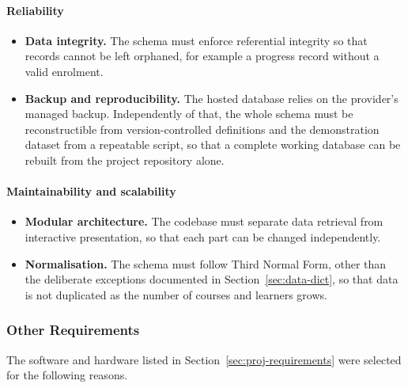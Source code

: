 \documentclass[12pt, oneside]{article} %
\begin{document}
\paragraph{Reliability}
\begin{itemize}
    \item \textbf{Data integrity.} The schema must enforce referential integrity so that records cannot be left orphaned, for example a progress record without a valid enrolment.
    \item \textbf{Backup and reproducibility.} The hosted database relies on the provider's managed backup. Independently of that, the whole schema must be reconstructible from version-controlled definitions and the demonstration dataset from a repeatable script, so that a complete working database can be rebuilt from the project repository alone.
\end{itemize}

\paragraph{Maintainability and scalability}
\begin{itemize}
    \item \textbf{Modular architecture.} The codebase must separate data retrieval from interactive presentation, so that each part can be changed independently.
    \item \textbf{Normalisation.} The schema must follow Third Normal Form, other than the deliberate exceptions documented in Section~\ref{sec:data-dict}, so that data is not duplicated as the number of courses and learners grows.
\end{itemize}

\subsubsection{Other Requirements}

The software and hardware listed in Section~\ref{sec:proj-requirements} were selected for the following reasons.
\end{document}

